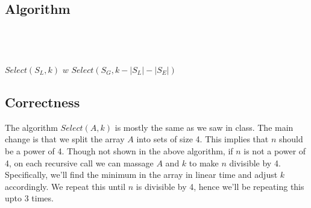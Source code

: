 \documentclass{article}
\begin{document}
    \subsection*{Algorithm}
        \begin{algorithm}[H]
            \begin{algorithmic}
                    \State {} \\

                    \State {}
                    \State {}
                    \State {}
                    \State {} \\

                    \State {}
                    \State {}
                    \State {}
                    \State {} \\

                        \State \Return $Select(S_L, k)$
                        \State \Return $w$
                    \Else
                        \State \Return $Select(S_G, k - |S_L| - |S_E|)$
                    \EndIf
                \EndProcedure
            \end{algorithmic}
        \end{algorithm}

    \subsection*{Correctness}
    The algorithm $Select(A, k)$ is mostly the same as we saw in class. The main change is that we split the array $A$ into sets of size 4. This implies that $n$ should be a power of 4. Though not shown in the above algorithm, if $n$ is not a power of 4, on each recursive call we can massage $A$ and $k$ to make $n$ divisible by 4. Specifically, we'll find the minimum in the array in linear time and adjust $k$ accordingly. We repeat this until $n$ is divisible by 4, hence we'll be repeating this upto 3 times.
\end{document}

